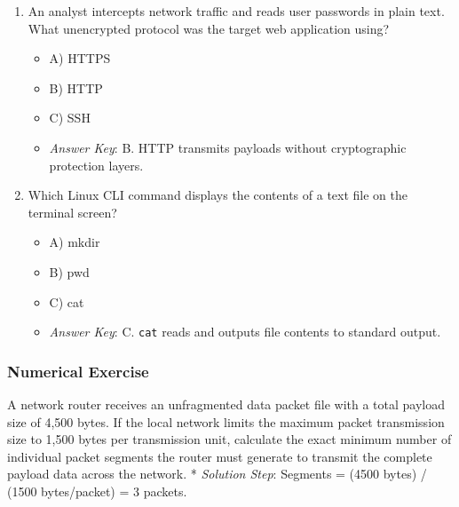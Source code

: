 \documentclass[12pt,openany]{book}
\begin{document}
\begin{enumerate}

  \item An analyst intercepts network traffic and reads user passwords in plain text. What unencrypted protocol was the target web application using?

\begin{itemize}

  \item A) HTTPS

  \item B) HTTP

  \item C) SSH

  \item \textit{Answer Key}: B. HTTP transmits payloads without cryptographic protection layers.

\end{itemize}

  \item Which Linux CLI command displays the contents of a text file on the terminal screen?

\begin{itemize}

  \item A) mkdir

  \item B) pwd

  \item C) cat

  \item \textit{Answer Key}: C. \texttt{cat} reads and outputs file contents to standard output.

\end{itemize}

\end{enumerate}


\subsubsection*{Numerical Exercise}


A network router receives an unfragmented data packet file with a total payload size of 4,500 bytes. If the local network limits the maximum packet transmission size to 1,500 bytes per transmission unit, calculate the exact minimum number of individual packet segments the router must generate to transmit the complete payload data across the network.
* \textit{Solution Step}: Segments = (4500 bytes) / (1500 bytes/packet) = 3 packets.
\end{document}
